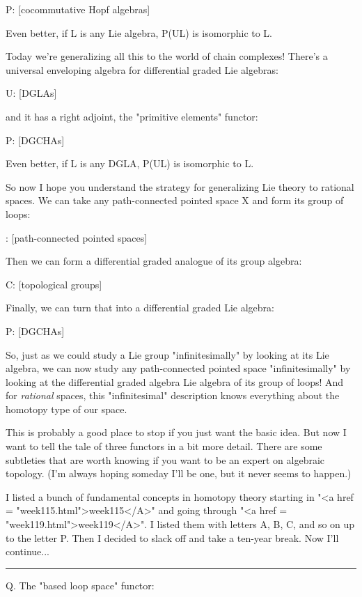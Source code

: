 P: [cocommutative Hopf algebras] 

Even better, if L is any Lie algebra, P(UL) is isomorphic to L.  

Today we're generalizing all this to the world of chain complexes!  
There's a universal enveloping algebra for differential graded 
Lie algebras:

U: [DGLAs] \to  [DGCHAs]

and it has a right adjoint, the "primitive elements" functor:

P: [DGCHAs] \to  [DGLAs]

Even better, if L is any DGLA, P(UL) is isomorphic to L.  

So now I hope you understand the strategy for generalizing Lie theory
to rational spaces.  We can take any path-connected pointed space X and
form its group of loops:

\Omega : [path-connected pointed spaces] 

Then we can form a differential graded analogue of its group
algebra:

C: [topological groups] \to  [DGCHAs]

Finally, we can turn that into a differential graded Lie algebra:

P: [DGCHAs] \to  [DGLAs]

So, just as we could study a Lie group "infinitesimally" by looking at
its Lie algebra, we can now study any path-connected pointed space
"infinitesimally" by looking at the differential graded algebra Lie
algebra of its group of loops!  And for \emph{rational} spaces, this
"infinitesimal" description knows everything about the homotopy type
of our space.

This is probably a good place to stop if you just want the basic
idea.  But now I want to tell the tale of three functors in a bit
more detail.  There are some subtleties that are worth knowing if 
you want to be an expert on algebraic topology.  (I'm always hoping
someday I'll be one, but it never seems to happen.)

I listed a bunch of fundamental concepts in homotopy theory starting
in "<a href = "week115.html">week115</A>" and going through
"<a href = "week119.html">week119</A>".  I listed them with
letters A, B, C, and so on up to the letter P.  Then I decided to slack
off and take a ten-year break.  Now I'll continue...

\par\noindent\rule{\textwidth}{0.4pt}
Q.  The "based loop space" functor:

